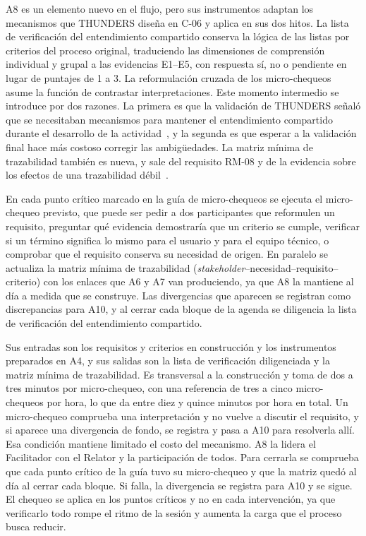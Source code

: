 \documentclass[12pt,letterpaper,oneside]{report}
\begin{document}
A8 es un elemento nuevo en el flujo, pero sus instrumentos adaptan los
mecanismos que THUNDERS diseña en C-06 y aplica en sus dos hitos. La lista de
verificación del entendimiento compartido conserva la lógica de las listas por
criterios del proceso original, traduciendo las dimensiones de comprensión
individual y grupal a las evidencias E1--E5, con respuesta sí, no o pendiente
en lugar de puntajes de 1 a 3. La reformulación cruzada de los micro-chequeos
asume la función de contrastar interpretaciones. Este momento intermedio se
introduce por dos razones. La primera es que la validación de THUNDERS señaló
que se necesitaban mecanismos para mantener el entendimiento compartido durante el
desarrollo de la actividad~\cite{agredo2022exploratory}, y la segunda es que
esperar a la validación final hace más costoso corregir las ambigüedades. La matriz mínima de trazabilidad también es
nueva, y sale del requisito RM-08 y de la evidencia sobre los efectos de una
trazabilidad débil~\cite{fucci2022traceability}.

En cada punto crítico marcado en la guía de micro-chequeos se ejecuta el
micro-chequeo previsto, que puede ser pedir a dos participantes que reformulen
un requisito, preguntar qué evidencia demostraría que un criterio se cumple,
verificar si un término significa lo mismo para el usuario y para el equipo
técnico, o comprobar que el requisito conserva su necesidad de origen. En
paralelo se actualiza la matriz mínima de trazabilidad
(\textit{stakeholder}--necesidad--requisito--criterio) con los enlaces que A6 y
A7 van produciendo, ya que A8 la mantiene al día a medida que se construye. Las
divergencias que aparecen se registran como discrepancias para A10, y al cerrar
cada bloque de la agenda se diligencia la lista de verificación del
entendimiento compartido.

Sus entradas son los requisitos y criterios en construcción y los instrumentos
preparados en A4, y sus salidas son la lista de verificación diligenciada y la
matriz mínima de trazabilidad. Es transversal a la construcción y toma de dos a
tres minutos por micro-chequeo, con una referencia de tres a cinco
micro-chequeos por hora, lo que da entre diez y quince minutos por hora en
total. Un micro-chequeo comprueba una interpretación y no vuelve a discutir el
requisito, y si aparece una divergencia de fondo, se registra y pasa a A10
para resolverla allí. Esa condición mantiene limitado el costo del mecanismo. A8 la lidera el Facilitador con el Relator y la
participación de todos. Para cerrarla se comprueba que cada punto crítico de la
guía tuvo su micro-chequeo y que la matriz quedó al día al cerrar cada bloque.
Si falla, la divergencia se registra para A10 y se sigue. El chequeo se aplica
en los puntos críticos y no en cada intervención, ya que verificarlo todo rompe
el ritmo de la sesión y aumenta la carga que el proceso busca reducir.
\end{document}
